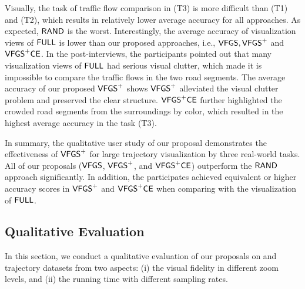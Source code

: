 

Visually, the task of traffic flow comparison in (T3) is more difficult than (T1) and (T2), which results in relatively lower average accuracy for all approaches.
As expected, $\mathsf{RAND}$ is the worst.
Interestingly, the average accuracy of visualization views of $\mathsf{FULL}$ is lower than our proposed approaches, i.e., $\mathsf{VFGS},\mathsf{VFGS}^{+}$ and $\mathsf{VFGS}^{+}\mathsf{CE}$.
In the post-interviews, the participants pointed out that many visualization views of $\mathsf{FULL}$ had serious visual clutter,
which made it is impossible to compare the traffic flows in the two road segments.
The average accuracy of our proposed $\mathsf{VFGS}^{+}$ shows $\mathsf{VFGS}^{+}$ alleviated the visual clutter problem and preserved the clear structure.
$\mathsf{VFGS}^{+}\mathsf{CE}$ further highlighted the crowded road segments from the surroundings by color, which {resulted in} the highest average accuracy in the task (T3).

In summary, the qualitative user study of our proposal demonstrates the effectiveness of $\mathsf{VFGS}^{+}$ for large trajectory visualization by three real-world tasks.
All of our proposals ($\mathsf{VFGS}$, $\mathsf{VFGS}^{+}$, and $\mathsf{VFGS}^{+}\mathsf{CE}$) outperform the $\mathsf{RAND}$ approach significantly.
In addition, the participates achieved equivalent or higher accuracy scores in $\mathsf{VFGS}^{+}$ and $\mathsf{VFGS}^{+}\mathsf{CE}$ when comparing with the visualization of $\mathsf{FULL}$.

\subsection{Qualitative Evaluation}\label{sec:quality}
In this section, we conduct a qualitative evaluation of our proposals on \pt{} and \sz{} trajectory datasets from two aspects: (i) the visual fidelity in different zoom levels,
and (ii) the running time with different sampling rates.

